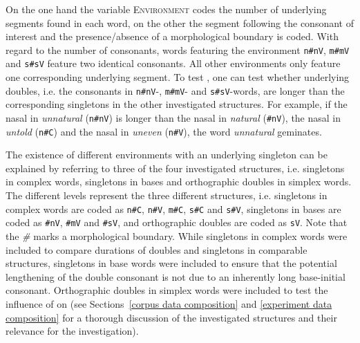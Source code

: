   
  On the one hand the variable \textsc{Environment} codes the number of underlying segments found in each word, on the other the segment following the consonant of interest and the presence/absence of a morphological boundary is coded.  With regard to the number of consonants,  words featuring the environment \texttt{n\#nV}, \texttt{m\#mV} and \texttt{s\#sV} feature two identical consonants. All other environments only feature one corresponding underlying segment. 
  To test , one can test whether underlying doubles, i.e. the consonants in \texttt{n\#nV}-,  \texttt{m\#mV}- and \texttt{s\#sV}-words, are longer than the corresponding singletons in the other investigated structures. For example, if the nasal in \textit{unnatural} (\texttt{n\#nV}) is longer than the nasal in \textit{natural} (\texttt{\#nV}), the nasal in \textit{untold} (\texttt{n\#C}) and the nasal in \textit{uneven} (\texttt{n\#V}), the word \textit{unnatural} {geminates}.
  
  The existence of different environments with an underlying singleton can be explained by referring to three of the four investigated structures, i.e. singletons in complex words, singletons in bases and orthographic doubles in simplex words. The different levels represent the three different structures, i.e. singletons in complex words are coded as \texttt{n\#C}, \texttt{n\#V}, \texttt{m\#C}, \texttt{s\#C} and \texttt{s\#V}, singletons in bases are coded as \texttt{\#nV}, \texttt{\#mV} and \texttt{\#sV}, and orthographic doubles are coded as \texttt{sV}. Note that the \textit{\#} marks a morphological boundary.
  While singletons in complex words were included to compare durations of doubles and singletons in comparable structures, singletons in base words were included to ensure that the potential lengthening of the double consonant is not due to an inherently long base-initial consonant. Orthographic doubles in simplex words were included to test the influence of  on  (see Sections~\ref{corpus data composition} and \ref{experiment data composition} for a thorough discussion of the investigated structures and their relevance for the investigation).
  
  

